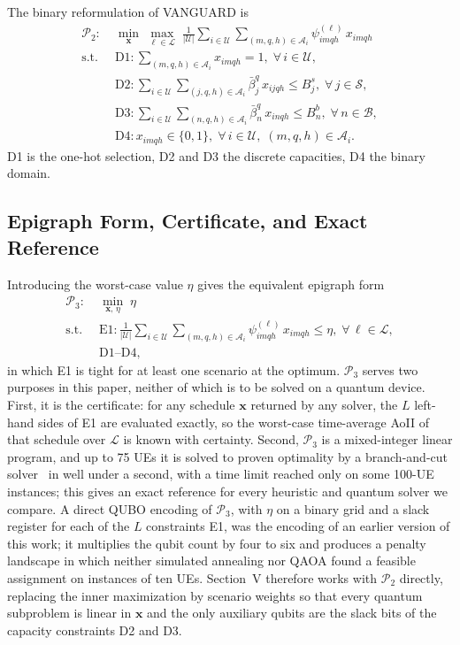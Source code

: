 The binary reformulation of VANGUARD is
\begin{align}
    \mathscr{P}_{2}:\;&\min_{\mathbf{x}}\;\max_{\ell\in\mathscr{L}}\;
    \frac{1}{|\mathscr{U}|}\sum_{i\in\mathscr{U}}\sum_{(m,q,h)\in\mathscr{A}_i}\psi_{imqh}^{(\ell)}\,x_{imqh}
    \nonumber\\
    \text{s.t.}\;\;
    &\text{D1}:\sum_{(m,q,h)\in\mathscr{A}_i}x_{imqh}=1,\;\forall\,i\in\mathscr{U},
    \nonumber\\
    &\text{D2}:\sum_{i\in\mathscr{U}}\sum_{(j,q,h)\in\mathscr{A}_i}\bar{\beta}^{q}_{j}\,x_{ijqh}\leq B^{s}_{j},
    \;\forall\,j\in\mathscr{S},
    \nonumber\\
    &\text{D3}:\sum_{i\in\mathscr{U}}\sum_{(n,q,h)\in\mathscr{A}_i}\bar{\beta}^{q}_{n}\,x_{inqh}\leq B^{b}_{n},
    \;\forall\,n\in\mathscr{B},
    \nonumber\\
    &\text{D4}:x_{imqh}\in\{0,1\},\;\forall\,i\in\mathscr{U},\;(m,q,h)\in\mathscr{A}_i.
    \nonumber
\end{align}
D1 is the one-hot selection, D2 and D3 the discrete capacities, D4 the binary domain.

\subsection{Epigraph Form, Certificate, and Exact Reference}
\label{sec:epigraph}

Introducing the worst-case value $\eta$ gives the equivalent epigraph form
\begin{align}
    \mathscr{P}_{3}:\;&\min_{\mathbf{x},\,\eta}\;\eta
    \nonumber\\
    \text{s.t.}\;\;&\text{E1}:\frac{1}{|\mathscr{U}|}\sum_{i\in\mathscr{U}}\sum_{(m,q,h)\in\mathscr{A}_i}
    \psi_{imqh}^{(\ell)}\,x_{imqh}\leq\eta,\;\forall\,\ell\in\mathscr{L},
    \nonumber\\
    &\text{D1--D4},
    \nonumber
\end{align}
in which E1 is tight for at least one scenario at the optimum. $\mathscr{P}_{3}$ serves two purposes in this paper,
neither of which is to be solved on a quantum device. First, it is the certificate: for any schedule $\mathbf{x}$
returned by any solver, the $L$ left-hand sides of E1 are evaluated exactly, so the worst-case time-average AoII of
that schedule over $\mathscr{L}$ is known with certainty. Second, $\mathscr{P}_{3}$ is a mixed-integer linear program,
and up to 75 UEs it is solved to proven optimality by a branch-and-cut solver~\cite{HiGHS2018} in well under a
second, with a time limit reached only on some 100-UE instances; this gives an exact reference for every heuristic and
quantum solver we compare. A direct
QUBO encoding of $\mathscr{P}_{3}$, with $\eta$ on a binary grid and a slack register for each of the $L$
constraints E1, was the encoding of an earlier version of this work; it multiplies the qubit count by four to six
and produces a penalty landscape in which neither simulated annealing nor QAOA found a feasible assignment on
instances of ten UEs. Section~V therefore works with $\mathscr{P}_{2}$ directly, replacing the inner maximization by
scenario weights so that every quantum subproblem is linear in $\mathbf{x}$ and the only auxiliary qubits are the
slack bits of the capacity constraints D2 and D3.
